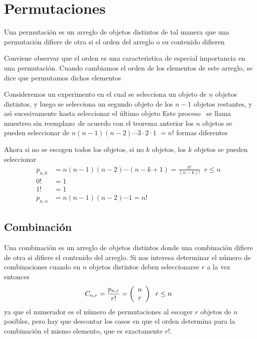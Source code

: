 \documentclass{article}%
\begin{document}
\section{Permutaciones}%

\begin{definition}
Una permutaci\'{o}n es un arreglo de objetos distintos de tal manera que una
permutaci\'{o}n difiere de otra si el orden del arreglo o su contenido
difieren
\end{definition} 

Conviene observar que el orden es una caracter\'{\i}stica de especial
importancia en una permutaci\'{o}n. Cuando cambiamos el orden de los elementos
de este arreglo, se dice que permutamos dichos elementos

Consideremos un experimento en el cual se selecciona un objeto de $n$ objetos
distintos, y luego se selecciona un segundo objeto de los $n-1$ objetos
restantes, y as\'{\i} sucesivamente hasta seleccionar el \'{u}ltimo objeto
Este proceso \ se llama muestreo sin reemplazo\ de acuerdo con el teorema
anterior los $n$ objetos se pueden seleccionar de $n\left(  n-1\right)
\left(  n-2\right)  \cdots3\cdot2\cdot1$ $=n!$ formas diferentes\ 

Ahora si no se escogen todos los objetos, si no $k$ objetos, los $k$ objetos
se pueden seleccionar
\begin{align*}
p_{n,k} &  =n\left(  n-1\right)  \left(  n-2\right)  \cdots\left(
n-k+1\right)  =\frac{n!}{\left(  n-k\right)  !}\;\;r\leq n\\
0! &  =1\\
1! &  =1\\
p_{n,n} &  =n\left(  n-1\right)  \left(  n-2\right)  \cdots1=n!
\end{align*}

\subsection{Combinaci\'{o}n}

Una combinaci\'{o}n es un arreglo de objetos distintos donde una
combinaci\'{o}n difiere de otra si difiere el contenido del arreglo. Si nos
interesa determinar el n\'{u}mero de combinaciones cuando en $n$ objetos
distintos deben seleccionarse $r$ a la vez entonces
\[
C_{n,r}=\frac{p_{n,r}}{r!}=\left(
\begin{array}
[c]{c}%
n\\
r
\end{array}
\right)  \;\;r\leq n
\]
ya que el numerador es el n\'{u}mero de permutaciones al escoger $r$ objetos
de $n$ posibles, pero hay que descontar los casos en que el orden determina
para la combinaci\'{o}n el mismo elemento, que es exactamente $r!.$
\end{document}
